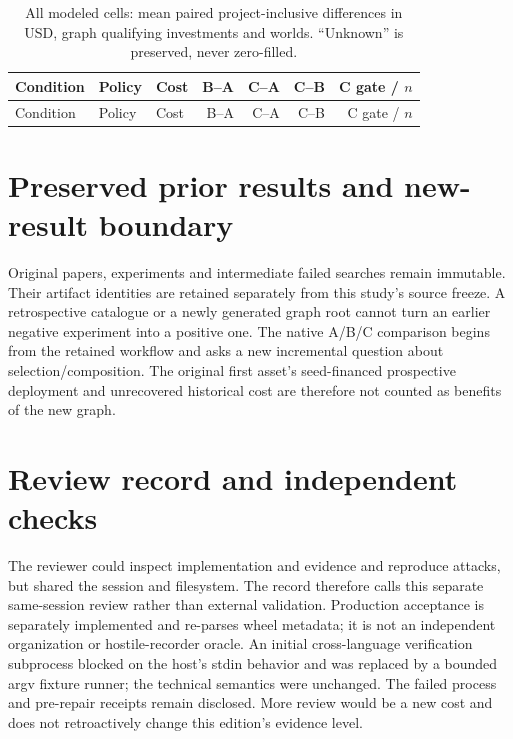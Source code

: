 \documentclass[11pt,a4paper]{article}
\begin{document}
\begin{longtable}{L{30mm}L{22mm}L{19mm}rrrr}
\caption{All modeled cells: mean paired project-inclusive differences in USD, graph qualifying investments and worlds. ``Unknown'' is preserved, never zero-filled.}\\
\toprule Condition & Policy & Cost & B--A & C--A & C--B & C gate / $n$ \\
\midrule\endfirsthead
\toprule Condition & Policy & Cost & B--A & C--A & C--B & C gate / $n$ \\
\midrule\endhead

\end{longtable}

\section{Preserved prior results and new-result boundary}
\label{app:heritage}


Original papers, experiments and intermediate failed searches remain immutable. Their artifact identities are retained separately from this study's source freeze. A retrospective catalogue or a newly generated graph root cannot turn an earlier negative experiment into a positive one. The native A/B/C comparison begins from the retained workflow and asks a new incremental question about selection/composition. The original first asset's seed-financed prospective deployment and unrecovered historical cost are therefore not counted as benefits of the new graph.

\section{Review record and independent checks}
\label{app:review}


The reviewer could inspect implementation and evidence and reproduce attacks, but shared the session and filesystem. The record therefore calls this separate same-session review rather than external validation. Production acceptance is separately implemented and re-parses wheel metadata; it is not an independent organization or hostile-recorder oracle. An initial cross-language verification subprocess blocked on the host's stdin behavior and was replaced by a bounded argv fixture runner; the technical semantics were unchanged. The failed process and pre-repair receipts remain disclosed. More review would be a new cost and does not retroactively change this edition's evidence level.
\end{document}
